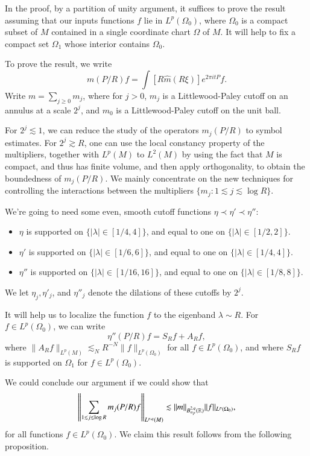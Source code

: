 In the proof, by a partition of unity argument, it suffices to prove the result assuming that our inputs functions $f$ lie in $L^p(\Omega_0)$, where $\Omega_0$ is a compact subset of $M$ contained in a single coordinate chart $\Omega$ of $M$. It will help to fix a compact set $\Omega_1$ whose interior contains $\Omega_0$.

To prove the result, we write
%
\[ m(P / R) f = \int [R \widehat{m}(R\xi) ] e^{2 \pi i t P} f. \]
%
Write $m = \sum_{j \geq 0} m_j$, where for $j > 0$, $m_j$ is a Littlewood-Paley cutoff on an annulus at a scale $2^j$, and $m_0$ is a Littlewood-Paley cutoff on the unit ball.

For $2^j \lesssim 1$, we can reduce the study of the operators $m_j(P/R)$ to symbol estimates. For $2^j \gtrsim R$, one can use the local constancy property of the multipliers, together with $L^p(M)$ to $L^2(M)$ by using the fact that $M$ is compact, and thus has finite volume, and then apply orthogonality, to obtain the boundedness of $m_j(P/R)$. We mainly concentrate on the new techniques for controlling the interactions between the multipliers $\{ m_j : 1 \lesssim j \lesssim \log R \}$.

We're going to need some even, smooth cutoff functions $\eta \prec \eta' \prec \eta''$:
%
\begin{itemize}
    \item $\eta$ is supported on $\{ |\lambda| \in [1/4,4] \}$, and equal to one on $\{ |\lambda| \in [1/2,2] \}$.

    \item $\eta'$ is supported on $\{ |\lambda| \in [1/6,6] \}$, and equal to one on $\{ |\lambda| \in [1/4,4] \}$.

    \item $\eta''$ is supported on $\{ |\lambda| \in [1/16,16] \}$, and equal to one on $\{ |\lambda| \in [1/8,8] \}$.
\end{itemize}
%
We let $\eta_j, \eta'_j$, and $\eta''_j$ denote the dilations of these cutoffs by $2^j$.

It will help us to localize the function $f$ to the eigenband $\lambda \sim R$. For $f \in L^p(\Omega_0)$, we can write
%
\[ \eta''(P/R) f = S_R f + A_R f, \]
%
where $\| A_R f \|_{L^p(M)} \lesssim_N R^{-N} \| f \|_{L^p(\Omega_0)}$ for all $f \in L^p(\Omega_0)$, and where $S_R f$ is supported on $\Omega_1$ for $f \in L^p(\Omega_0)$.

We could conclude our argument if we could show that
%
\[ \left\| \sum_{1 \lesssim j \lesssim \log R} m_j(P/R) f \right\|_{L^{p,q}(M)} \lesssim \| m \|_{B_{\alpha_p}^{2,q}(\operatorname{\mathbb{R}})} \| f \|_{L^p(\Omega_0)}, \]
%
for all functions $f \in L^p(\Omega_0)$. We claim this result follows from the following proposition.


